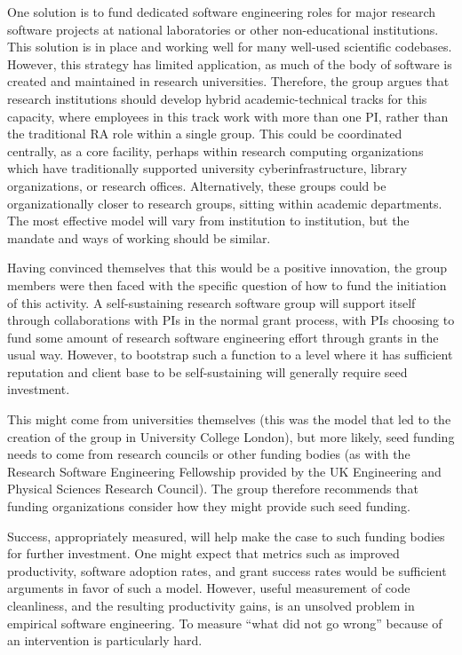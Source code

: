 One solution is to fund dedicated software engineering roles for major research
software projects at national laboratories or other non-educational
institutions. This solution is in place and working well for many well-used
scientific codebases. However, this strategy has limited application, as much of
the body of software is created and maintained in research universities.
Therefore, the group argues that research institutions should develop hybrid
academic-technical tracks for this capacity, where employees in this track work
with more than one PI, rather than the traditional RA role within a single
group. This could be coordinated centrally, as a core facility, perhaps within
research computing organizations which have traditionally supported university
cyberinfrastructure, library organizations, or research offices. Alternatively,
these groups could be organizationally closer to research groups, sitting within
academic departments. The most effective model will vary from institution to
institution, but the mandate and ways of working should be similar.

Having convinced themselves that this would be a positive innovation, the group members were
then faced with the specific question of how to fund the initiation of this
activity. A self-sustaining research software group will support itself through
collaborations with PIs in the normal grant process, with PIs choosing to fund
some amount of research software engineering effort through grants in the usual
way. However, to bootstrap such a function to a level where it has sufficient
reputation and client base to be self-sustaining will generally require seed
investment.

This might come from universities themselves (this was the model that led to the
creation of the group in University College London), but more likely, seed
funding needs to come from research councils or other funding bodies (as with the Research Software
Engineering Fellowship provided by the UK Engineering and Physical Sciences
Research Council). The group therefore recommends that funding organizations consider
how they might provide such seed funding.

Success, appropriately measured, will help make the case to such funding bodies
for further investment. One might expect that metrics such as improved
productivity, software adoption rates, and grant success rates would be
sufficient arguments in favor of such a model. However, useful measurement of
code cleanliness, and the resulting productivity gains, is an unsolved problem
in empirical software engineering. To measure ``what did not go wrong'' because
of an intervention is particularly hard.

